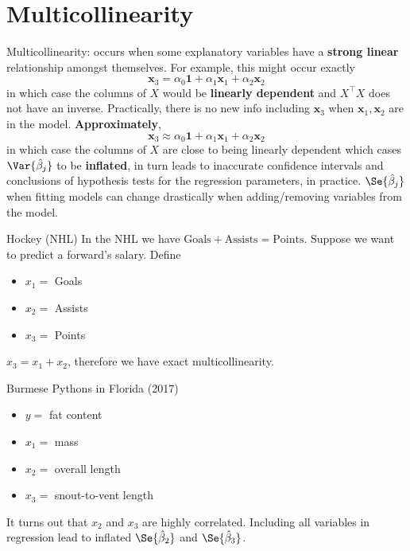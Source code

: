 \section{Multicollinearity}
Multicollinearity: occurs when some explanatory
variables have a \textbf{strong linear}
relationship amongst themselves. For example,
this might occur exactly
\[ \symbf{x}_3=\alpha_0\symbf{1}+\alpha_1\symbf{x}_1+\alpha_2\symbf{x}_2 \]
in which case the columns of $ X $ would be \textbf{linearly dependent}
and $ X^\top X $ does not have an inverse. Practically,
there is no new info including $ \symbf{x}_3 $
when $ \symbf{x}_1,\symbf{x}_2 $ are in the model.
\textbf{Approximately},
\[ \symbf{x}_3\approx \alpha_0\symbf{1}+\alpha_1\symbf{x}_1+\alpha_2\symbf{x}_2 \]
in which case the columns of $ X $ are close to being
linearly dependent which cases $ \Var{\hat{\beta}_j} $
to be \textbf{inflated}, in turn leads to inaccurate confidence
intervals and conclusions of hypothesis tests
for the regression parameters, in practice.
$ \Se{\hat{\beta}_j} $ when fitting models can change drastically
when adding/removing variables from the model.

\begin{Example}{Hockey (NHL)}{}
    In the NHL we have $ \text{Goals}+\text{Assists}=\text{Points} $.
    Suppose we want to predict a forward's salary. Define
    \begin{itemize}
        \item $ x_1= $ Goals
        \item $ x_2= $ Assists
        \item $ x_3= $ Points
    \end{itemize}
    $ x_3=x_1+x_2 $, therefore we have exact multicollinearity.
\end{Example}
\begin{Example}{Burmese Pythons in Florida (2017)}{}
    \begin{itemize}
        \item $ y= $ fat content
        \item $ x_1= $ mass
        \item $ x_2= $ overall length
        \item $ x_3= $ snout-to-vent length
    \end{itemize}
    It turns out that $ x_2 $ and $ x_3 $ are highly
    correlated. Including all variables in
    regression lead to inflated $ \Se{\hat{\beta}_2} $
    and $ \Se{\hat{\beta}_3} $.
\end{Example}

